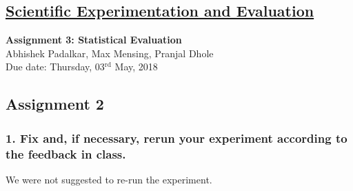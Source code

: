 \documentclass[11pt,a4paper,openright,twoside]{extreport}
\begin{document}
\begin{center}
\section*{\underline{Scientific Experimentation and Evaluation}}

\large{\textbf{Assignment 3: Statistical Evaluation}}\\
\large{Abhishek Padalkar, Max Mensing, Pranjal Dhole}\\
\large{Due date: Thursday, 03$^{\text{rd}}$ May, 2018}
\end{center}

\subsection*{Assignment 2}
\subsubsection*{1. Fix and, if necessary, rerun your experiment according to the feedback in class.}
We were not suggested to re-run the experiment.
\end{document}

